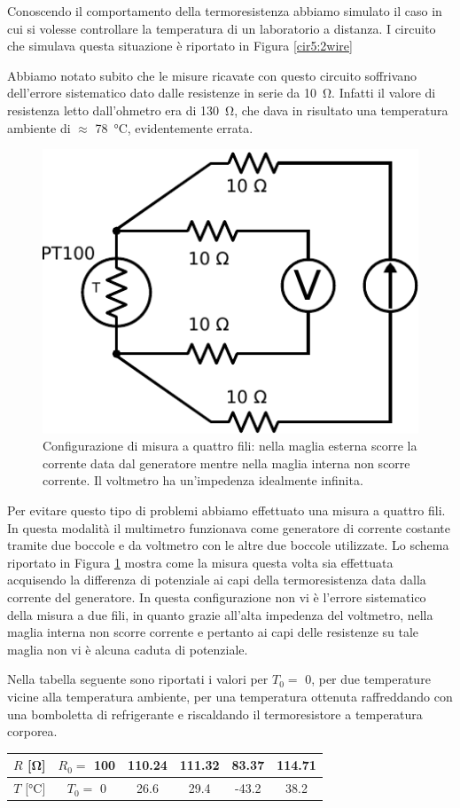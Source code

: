 Conoscendo il comportamento della termoresistenza abbiamo simulato il caso in cui si volesse controllare la temperatura di un laboratorio a distanza.
I circuito che simulava questa situazione è riportato in Figura \ref{cir5:2wire}

Abbiamo notato subito che le misure ricavate con questo circuito soffrivano dell'errore sistematico dato dalle resistenze in serie da \SI{10}{\ohm}.
Infatti il valore di resistenza letto dall'ohmetro era di \SI{130}{\ohm}, che dava in risultato una temperatura ambiente di $\approx$ \SI{78}{\degreeCelsius}, evidentemente errata.


\begin{figure}
\centering
\includegraphics[width=.25\textwidth]{../E05/latex/c_PT100_4wire.pdf}
\caption{Configurazione di misura a quattro fili: nella maglia esterna scorre la corrente data dal generatore mentre nella maglia interna non scorre corrente. Il voltmetro ha un'impedenza idealmente infinita.}
\label{cir5:4wire}
\end{figure}

Per evitare questo tipo di problemi abbiamo effettuato una misura a quattro fili.
In questa modalità il multimetro funzionava come generatore di corrente costante tramite due boccole e da voltmetro con le altre due boccole utilizzate.
Lo schema riportato in Figura \ref{cir5:4wire} mostra come la misura questa volta sia effettuata acquisendo la differenza di potenziale ai capi della termoresistenza data dalla corrente del generatore.
In questa configurazione non vi è l'errore sistematico della misura a due fili, in quanto grazie all'alta impedenza del voltmetro, nella maglia interna non scorre corrente e pertanto ai capi delle resistenze su tale maglia non vi è alcuna caduta di potenziale.

Nella tabella seguente sono riportati i valori per $T_0 =$ 0, per due temperature vicine alla temperatura ambiente, per una temperatura ottenuta raffreddando con una bomboletta di refrigerante e riscaldando il termoresistore a temperatura corporea.

\begin{center}
{\renewcommand{\arraystretch}{1.4}%
\begin{tabular}{c|c c c c c}
$R$ [\si{\ohm}] 		& $R_0 =$ 100 	& 110.24 & 111.32 & 83.37 & 114.71\\ 
\hline 
$T$ [\si{\degreeCelsius}] 	& $T_0 =$ 0 	& 26.6 & 29.4 & -43.2 & 38.2 \\ 
\end{tabular}}
\end{center}


